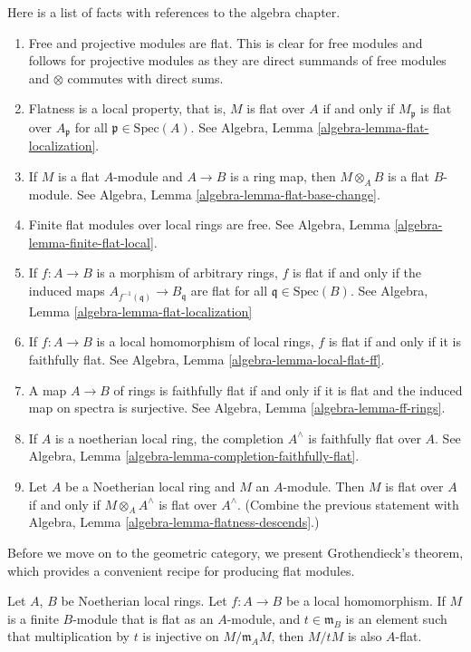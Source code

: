 \noindent
Here is a list of facts with references to the algebra chapter.
\begin{enumerate}
\item Free and projective modules are flat. This is clear for free modules
and follows for projective modules as they are direct summands of free
modules and $\otimes$ commutes with direct sums.
\item Flatness is a local property, that is, $M$ is flat over $A$
if and only if $M_{\mathfrak p}$ is flat over $A_{\mathfrak p}$ for all
$\mathfrak p \in \text{Spec}(A)$.
See Algebra, Lemma \ref{algebra-lemma-flat-localization}.
\item If $M$ is a flat $A$-module and $A \to B$ is a ring map,
then $M \otimes_A B$ is a flat $B$-module. See
Algebra, Lemma \ref{algebra-lemma-flat-base-change}.
\item Finite flat modules over local rings are free.
See Algebra, Lemma \ref{algebra-lemma-finite-flat-local}.
\item If $f : A \to B$ is a morphism of arbitrary rings,
$f$ is flat if and only if the induced maps
$A_{f^{-1}(\mathfrak q)} \to B_{\mathfrak q}$ are flat for all
$\mathfrak q \in \text{Spec}(B)$.
See Algebra, Lemma \ref{algebra-lemma-flat-localization}
\item If $f : A \to B$ is a local homomorphism of local rings,
$f$ is flat if and only if it is faithfully flat.
See Algebra, Lemma \ref{algebra-lemma-local-flat-ff}.
\item A map $A \to B$ of rings is faithfully flat if and only if it is
flat and the induced map on spectra is surjective.
See Algebra, Lemma \ref{algebra-lemma-ff-rings}.
\item If $A$ is a noetherian local ring, the completion
$A^\wedge$ is faithfully flat over $A$.
See Algebra, Lemma \ref{algebra-lemma-completion-faithfully-flat}.
\item Let $A$ be a Noetherian local ring and $M$ an $A$-module.
Then $M$ is flat over $A$ if and only if $M \otimes_A A^\wedge$
is flat over $A^\wedge$. (Combine the previous statement with
Algebra, Lemma \ref{algebra-lemma-flatness-descends}.)
\end{enumerate}
Before we move on to the geometric category, we present Grothendieck's
theorem, which provides a convenient recipe for producing flat
modules.

\begin{theorem}
\label{theorem-flatness-grothendieck}
Let $A$, $B$ be Noetherian local rings.
Let $f : A \to B$ be a local homomorphism.
If $M$ is a finite $B$-module that is flat as an $A$-module,
and $t \in \mathfrak m_B$ is an element such that multiplication
by $t$ is injective on $M/\mathfrak m_AM$, then $M/tM$ is also $A$-flat.
\end{theorem}

